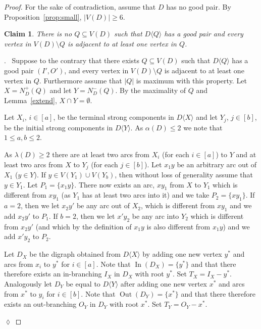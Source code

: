 \documentclass{article}
\newtheorem{claim}{Claim}[theorem]
\theoremstyle{definition}
\newcommand{\induce}[2]{#1\langle #2 \rangle}
\DeclareMathOperator{\Out}{Out}
\DeclareMathOperator{\In}{In}
\newcommand{\2}{\vspace{0.2cm}}
\newenvironment{subproof}{\par\noindent {\it Proof}.\ }{\hfill$\lozenge$\par\vspace{11pt}}
\begin{document}
\begin{proof}
For the sake of contradiction, assume that $D$ has no good pair.  By
Proposition~\ref{prop:small}, $|V(D)|\geq 6$.

\begin{claim}\label{claimA}
There is no $Q \subseteq V(D)$ such that $\induce{D}{Q}$ has a good
pair and every vertex in $V(D) \setminus Q$ is adjacent to at least
one vertex in $Q$.
\end{claim}
\begin{subproof}
Suppose to the contrary that there exists $Q \subseteq V(D)$ such that
$\induce{D}{Q}$ has a good pair $(I',O')$, and every vertex in $V(D)
\setminus Q$ is adjacent to at least one vertex in $Q$. Furthermore
assume that $|Q|$ is maximum with this property. Let $X = N_D^+(Q)$
and let $Y=N_D^-(Q)$.  By the maximality of $Q$ and
Lemma~\ref{extend}, $X \cap Y = \emptyset$.


Let $X_i$, $i\in [a]$, be the terminal strong components in
$\induce{D}{X}$ and let $Y_j$, $j\in [b]$, be the initial strong
components in $\induce{D}{Y}$.  As $\alpha(D) \leq 2$ we note that $1
\leq a,b \leq 2$.

As $\lambda(D) \geq 2$ there are at least two arcs from $X_i$ (for
each $i \in[a]$) to $Y$ and at least two arcs from $X$ to $Y_j$ (for
each $j \in [b]$). Let $x_1 y$ be an arbitrary arc out of $X_1$ ($ y
\in Y$). If $y \in V(Y_1) \cup V(Y_b)$, then without loss of
generality assume that $y \in Y_1$.  Let $P_1 = \{ x_1y \}$.  There
now exists an arc, $x y_1$ from $X$ to $Y_1$ which is different from
$x y_1$ (as $Y_1$ has at least two arcs into it) and we take $P_2 =
\{x y_1\}$.  If $a=2$, then we let $x_2 y'$ be any arc out of $X_2$,
which is different from $x y_1$ and we add $x_2y'$ to $P_1$.  If
$b=2$, then we let $x' y_2$ be any arc into $Y_2$ which is different
from $x_2 y'$ (and which by the definition of $x_1 y$ is also
different from $x_1 y$) and we add $x' y_2$ to $P_2$.

Let $D_X$ be the digraph obtained from $\induce{D}{X}$ by adding one
new vertex $y^*$ and arcs from $x_i$ to $y^*$ for $i \in [a]$. Note
that $\In(D_X) = \{y^*\}$ and that there therefore exists an
in-branching $I_X$ in $D_X$ with root $y^*$.  Set $T_X=I_X-y^*$.
Analogously let $D_Y$ be equal to $\induce{D}{Y}$ after adding one new
vertex $x^*$ and arcs from $x^*$ to $y_i$ for $i \in [b]$. Note that
$\Out(D_Y) = \{x^*\}$ and that there therefore exists an out-branching
$O_Y$ in $D_Y$ with root $x^*$.  Set $T_Y=O_Y-x^*$.


\end{subproof}
\end{proof}
\end{document}

